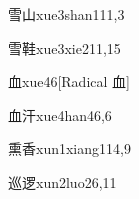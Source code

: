 \begin{verbete}{雪山}{xue3shan1}{11,3}
\end{verbete}

\begin{verbete}{雪鞋}{xue3xie2}{11,15}
\end{verbete}

\begin{verbete}{血}{xue4}{6}[Radical 血]
\end{verbete}

\begin{verbete}{血汗}{xue4han4}{6,6}
\end{verbete}

\begin{verbete}{熏香}{xun1xiang1}{14,9}
\end{verbete}

\begin{verbete}{巡逻}{xun2luo2}{6,11}
\end{verbete}


